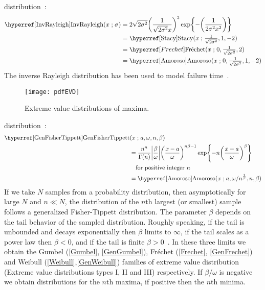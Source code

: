  distribution~\cite{Evans2000}:
\begin{align}
\label{InvRayleigh}
\opr{InvRayleigh}(x \given \sigma) 
&= 2 \sqrt{2 \sigma ^2}    \Left(\frac{1}{\sqrt{2 \sigma^2} x}\Right)^{3} \exp\Left\{-\Left(\frac{1}{2 \sigma^2 x^2}  \Right)\Right\}
\checked
\\
&=  \opr{Stacy}(x\given \tfrac{1}{\sqrt{2 \sigma^2}}, 1, -2)  \notag \checked \\
& = \Frechet(x\given 0, \tfrac{1}{\sqrt{2 \sigma^2}}, 2)\notag \\
&=  \opr{Amoroso}(x\given  0, \tfrac{1}{\sqrt{2 \sigma^2}}, 1, -2)  \checked \notag 
\end{align}
The inverse Rayleigh distribution has been used to model  failure time~\cite{Voda1972}.





\label{SecExtremeOrderStatistic}


\begin{figure}[t]
\begin{center}
\texttt{[image: pdfEVD]}
\end{center}
\caption{Extreme value distributions of maxima.}
\end{figure}



 distribution~\cite{Smirnov1949,Barndorff-Nielsen1963}:
\begin{align}
\label{GenFisherTippett}  
 \opr{GenFisherTippett}&(x\given  a, \omega, n, \beta) 
\notag
\\ \notag
&=
\frac{n^n}{\Gamma(n)} 
\Left|\frac{\beta}{\omega}\Right|
\Left(\frac{x-a}{\omega}\Right)^{n \beta -1}
\exp \Left\{
-  n \Left(\frac{x-a}{\omega}\Right)^{\beta}
\Right\} \checked
\\
& \quad \text{for positive integer } n
\\ \notag
& = \opr{Amoroso}(x\given a,{\omega}/{n^{\frac{1}{\beta} }},n,\beta) \checked
\end{align}
If we take $N$ samples from a probability distribution, then asymptotically for large $N$ and $n\ll N$, the distribution of the $n$th largest (or smallest) sample follows a generalized Fisher-Tippett distribution. The parameter $\beta$ depends on the tail behavior of the sampled distribution. Roughly speaking, if the tail is unbounded and decays exponentially then $\beta$ limits to $\infty$, if the tail scales as a power law then $\beta<0$,  and if the tail is finite $\beta>0$~\cite{Gumbel1958}. In these three limits we obtain the Gumbel (\ref{Gumbel}, \ref{GenGumbel}), Fr\'{e}chet (\ref{Frechet}, \ref{GenFrechet}) and Weibull (\ref{Weibull},\ref{GenWeibull}) families of extreme value distribution (Extreme value distributions types I, II and III) respectively. If $\beta/\omega$ is negative we obtain distributions for the $n$th maxima, if positive then the $n$th minima.

